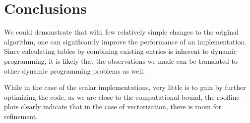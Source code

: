 \section{Conclusions}

We could demonstrate that with few relatively simple changes to the original
algorithm, one can significantly improve the performance of an implementation.
Since calculating tables by combining existing entries is inherent to dynamic
programming, it is likely that the observations we made can be translated to
other dynamic programming problems as well.

While in the case of the scalar implementations, very little is to gain by
further optimizing the code, as we are close to the computational bound, the
roofline-plots clearly indicate that in the case of vectorization, there is
room for refinement.
